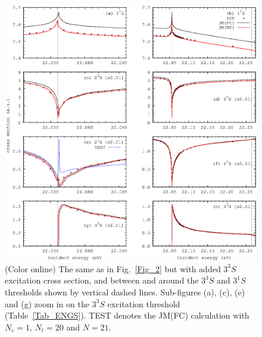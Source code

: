 \documentclass[aip
, pra
, showpacs
, aps
, twocolumn
, groupedaddress
, floatfix
]{revtex4}
\begin{document}
\begin{figure}[htb]
\includegraphics[scale=1]{fig3.ps}
\caption{(Color online)
The same as in Fig.~\ref{Fig_2} but with added $3^3S$ excitation cross section, and
between and around the $3^3S$ and $3^1S$ thresholds shown by vertical dashed lines.
Sub-figures (a), (c), (e) and (g) zoom in on the $3^3S$ excitation threshold (Table~\ref{Tab_ENGS}).
TEST denotes the JM(FC) calculation with $N_c=1$, $N_t=20$ and $N=21$.
}
\label{Fig_3}
\end{figure}
\end{document}
